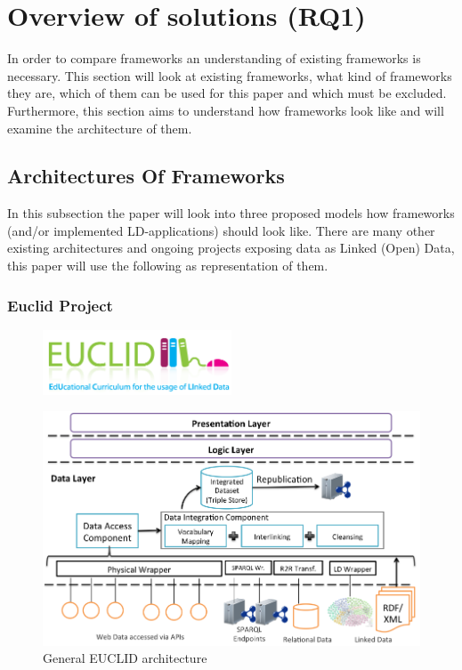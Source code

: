 \chapter{Overview of solutions (RQ1)}\label{overview}
In order to compare frameworks an understanding of existing frameworks is necessary. This section will look at existing frameworks, what kind of frameworks they are, which of them can be used for this paper and which must be excluded. Furthermore, this section aims to understand how frameworks look like and will examine the architecture of them.

\section{Architectures Of Frameworks}\label{arch_frameworks}
In this subsection the paper will look into three proposed models how frameworks (and/or implemented LD-applications) should look like. There are many other existing architectures and ongoing projects exposing data as Linked (Open) Data, this paper will use the following as representation of them.

\subsection{Euclid Project}

\begin{figure}[h]
	\centering
\includegraphics[width=0.5\textwidth]{img/euclid_logo.png}
\end{figure}

\begin{figure}[htbp]
	\centering
\includegraphics[width=1\textwidth]{img/euclid_architecture.png}
	\caption{General EUCLID architecture}
	\label{euclid_architecture}
\end{figure}

